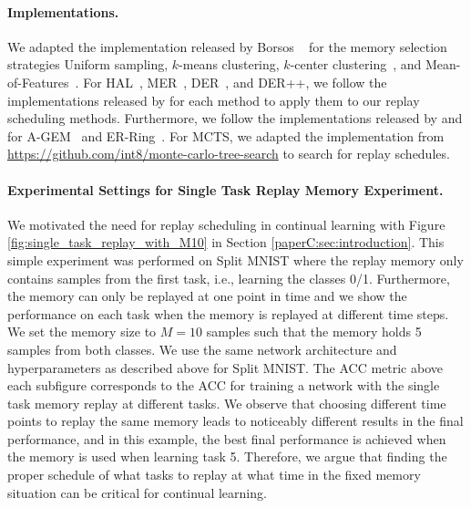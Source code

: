 \paragraph{Implementations.} We adapted the implementation released by Borsos \etal~ for the memory selection strategies Uniform sampling, $k$-means clustering, $k$-center clustering~, and Mean-of-Features~. For HAL~, MER~, DER~, and DER++, we follow the implementations released by  for each method to apply them to our replay scheduling methods. Furthermore, we follow the implementations released by  and  for A-GEM~ and ER-Ring~. For MCTS, we adapted the implementation from {\footnotesize \url{https://github.com/int8/monte-carlo-tree-search}} to search for replay schedules.

\vspace{-3mm}
\paragraph{Experimental Settings for Single Task Replay Memory Experiment.} We motivated the need for replay scheduling in continual learning with Figure \ref{fig:single_task_replay_with_M10} in Section \ref{paperC:sec:introduction}. This simple experiment was performed on Split MNIST where the replay memory only contains samples from the first task, i.e., learning the classes 0/1. Furthermore, the memory can only be replayed at one point in time and we show the performance on each task when the memory is replayed at different time steps. We set the memory size to $M=10$ samples such that the memory holds 5 samples from both classes. We use the same network architecture and hyperparameters as described above for Split MNIST. The ACC metric above each subfigure corresponds to the ACC for training a network with the single task memory replay at different tasks. We observe that choosing different time points to replay the same memory leads to noticeably different results in the final performance, and in this example, the best final performance is achieved when the memory is used when learning task 5. Therefore, we argue that finding the proper schedule of what tasks to replay at what time in the fixed memory situation can be critical for continual learning. 


